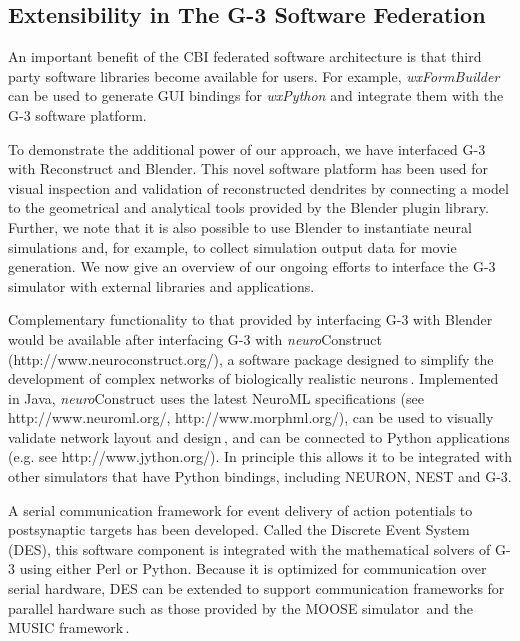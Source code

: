 \documentclass[12pt]{article}
\begin{document}
\subsection{Extensibility in The G-3 Software Federation}

An important benefit of the CBI federated software architecture is
that third party software libraries become available for users.  For
example, {\it wxFormBuilder} can be used to generate GUI bindings for
{\it wxPython} and integrate them with the G-3 software platform.

To demonstrate the additional power of our approach, we have
interfaced G-3 with Reconstruct and Blender. This novel software
platform has been used for visual inspection and validation of
reconstructed dendrites by connecting a model to the geometrical and
analytical tools provided by the Blender plugin library.  Further, we
note that it is also possible to use Blender to instantiate neural
simulations and, for example, to collect simulation output data for
movie generation.  We now give an overview of our ongoing efforts to
interface the G-3 simulator with external libraries and applications.

Complementary functionality to that provided by interfacing G-3 with
Blender would be available after interfacing G-3 with {\it
  neuro}Construct (http://www.neuroconstruct.org/), a software package
designed to simplify the development of complex networks of
biologically realistic neurons\,\cite{gleeson05:_build_networ_model,
  gleeson07}.  Implemented in Java, {\it neuro}Construct uses the
latest NeuroML specifications (see http://www.neuroml.org/,
http://www.morphml.org/), can be used to visually validate network
layout and design\,\cite{crook07:_morph}, and can be connected to
Python applications (e.g.  see http://www.jython.org/).  In principle
this allows it to be integrated with other simulators that have Python
bindings, including NEURON, NEST and G-3.

A serial communication framework for event delivery of action
potentials to postsynaptic targets has been developed.  Called the
Discrete Event System (DES), this software component is integrated
with the mathematical solvers of G-3 using either Perl or Python.
Because it is optimized for communication over serial hardware, DES
can be extended to support communication frameworks for parallel
hardware such as those provided by the MOOSE
simulator\,\cite{ray08:_pymoos} and the MUSIC
framework\,\cite{ekeberg08:_music_multis_coord}.
\end{document}
